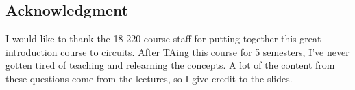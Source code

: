 \subsection*{Acknowledgment}
I would like to thank the 18-220 course staff for putting together this great
introduction course to circuits. After TAing this course for 5 semesters,
I've never gotten tired of teaching and relearning the concepts. A lot of the
content from these questions come from the lectures, so I give credit to the
slides.